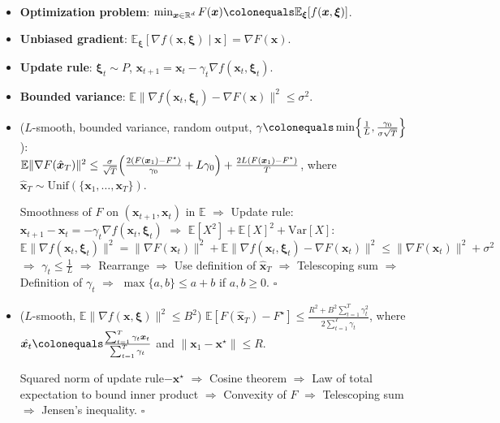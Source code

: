 \documentclass[8pt,a4paper]{extarticle}
\renewcommand{\proof}[1]{\begin{tcolorbox}#1 \hfill $\square$\end{tcolorbox}}
\newcommand{\lft}{\mathopen{}\mathclose\bgroup\left}
\newcommand{\rgt}{\aftergroup\egroup\right}
\newcommand{\E}{\mathbb{E}}
\newcommand{\R}{\mathbb{R}}
\newcommand{\Var}{\mathrm{Var}}
\renewcommand{\vec}[1]{\bm{#1}}
\newenvironment{topic}[1]
{\textbf{\sffamily \colorbox{black}{\rlap{\textbf{\textcolor{white}{#1}}}\hspace{\linewidth}\hspace{-2\fboxsep}}} \\ \vspace{0.2cm}}
{}
\begin{document}
\begin{multicols*}{2}
    \begin{topic}{Stochastic optimization}
        \begin{itemize}
            \item \textbf{Optimization problem}: $\min_{\vec{x} \in \R^d} F(\vec{x}) \colonequals \E_{\vec{\xi}}[f(\vec{x},
                          \vec{\xi})]$.
            \item \textbf{Unbiased gradient}: $\E_{\vec{\xi}}[\nabla f(\vec{x}, \vec{\xi}) \mid \vec{x}] = \nabla F(\vec{x})$.
            \item \textbf{Update rule}: $\vec{\xi}_t \sim P$, $\vec{x}_{t+1} = \vec{x}_t - \gamma_t \nabla f(\vec{x}_t, \vec{\xi}_t)$.
            \item \textbf{Bounded variance}: $\E \| \nabla f(\vec{x}_t, \vec{\xi}_t) - \nabla F(\vec{x}) \|^2 \leq \sigma^2$.
            \item ($L$-smooth, bounded variance, random output, $\gamma \colonequals \min \lft\{ \frac{1}{L}, \frac{\gamma_0}{\sigma \sqrt{T}} \rgt\}$): \\
                  $\E \| \nabla F(\hat{\vec{x}}_T) \|^2 \leq \frac{\sigma}{\sqrt{T}} \lft( \frac{2(F(\vec{x}_1) - F^\star)}{\gamma_0} + L \gamma_0 \rgt) + \frac{2L(F(\vec{x}_1) - F^\star)}{T}$, where $\hat{\vec{x}}_T \sim \mathrm{Unif}(\{ \vec{x}_1, \ldots, \vec{x}_T \})$.
                  \proof{Smoothness of $F$ on $(\vec{x}_{t+1}, \vec{x}_t)$ in $\E$ $\Rightarrow$ Update rule: $\vec{x}_{t+1} - \vec{x}_t = -\gamma_t \nabla f(\vec{x}_t, \vec{\xi}_t)$ $\Rightarrow$ $\E[X^2] + \E[X]^2 + \Var[X]$: $\E \| \nabla f(\vec{x}_t, \vec{\xi}_t) \|^2 = \| \nabla F(\vec{x}_t) \|^2 + \E \| \nabla f(\vec{x}_t, \vec{\xi}_t) - \nabla F(\vec{x}_t) \|^2 \leq \| \nabla F(\vec{x}_t) \|^2 + \sigma^2$ $\Rightarrow$ $\gamma_t \leq \frac{1}{L}$ $\Rightarrow$ Rearrange $\Rightarrow$ Use definition of $\hat{\vec{x}}_T$ $\Rightarrow$ Telescoping sum $\Rightarrow$ Definition of $\gamma_t$ $\Rightarrow$ $\max \{ a,b \} \leq a + b$ if $a,b \geq 0$.}
            \item ($L$-smooth, $\E \| \nabla f(\vec{x}, \vec{\xi}) \|^2 \leq B^2$)
                  $\E[F(\hat{\vec{x}}_T) - F^\star] \leq \frac{R^2 + B^2 \sum_{t=1}^{T} \gamma_t^2}{2 \sum_{t=1}^{T} \gamma_t}$, where $\hat{\vec{x}_t} \colonequals \frac{\sum_{t=1}^{T} \gamma_t \vec{x}_t}{\sum_{t=1}^{T} \gamma_t}$ and $\| \vec{x}_1 - \vec{x}^\star \| \leq R$.
                  \proof{Squared norm of update rule$-\vec{x}^\star$ $\Rightarrow$ Cosine theorem $\Rightarrow$ Law of total expectation to bound inner product $\Rightarrow$ Convexity of $F$ $\Rightarrow$ Telescoping sum $\Rightarrow$ Jensen's inequality.}

\end{itemize}
\end{topic}
\end{multicols*}
\end{document}
